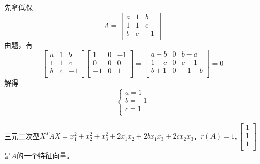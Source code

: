 \documentclass[lang=cn,10pt]{elegantbook}
\begin{document}
\begin{solution}
	
	先拿低保
	\begin{equation*}
		A=\left[ \begin{matrix}
			a&		1&		b\\
			1&		1&		c\\
			b&		c&		-1\\
		\end{matrix} \right]
	\end{equation*}
	由题，有
	\begin{equation*}
		\left[ \begin{matrix}
			a&		1&		b\\
			1&		1&		c\\
			b&		c&		-1\\
		\end{matrix} \right]\left[ \begin{matrix}
		1&		0&		-1\\
		0&		0&		0\\
		-1&		0&		1\\
		\end{matrix} \right]=\left[ \begin{matrix}
		a-b&		0&		b-a\\
		1-c&		0&		c-1\\
		b+1&		0&		-1-b\\
		\end{matrix} \right] =0
	\end{equation*}
	解得
	\begin{equation*}
		\begin{cases}
			a=1\\
			b=-1\\
			c=1\\
		\end{cases}
	\end{equation*}
\end{solution}
\begin{example}
	三元二次型$X^{T}AX=x_{1}^{2}+x_{2}^{2}+x_{3}^{2}+2x_{1}x_{2}+2bx_{1}x_{3}+2cx_{2}x_{3}$，$r(A)=1,\left[ \begin{array}{c}
		1\\
		1\\
		1\\
	\end{array} \right] $是$A$的一个特征向量。
\end{example}
\end{document}
